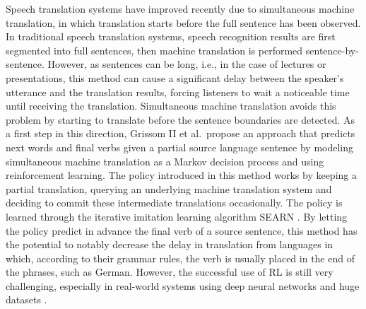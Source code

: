 Speech translation systems have improved recently due to simultaneous machine translation, in which translation starts before the full sentence has been observed. In traditional speech translation systems, speech recognition results are first segmented into full sentences, then machine translation is performed sentence-by-sentence. However, as sentences can be long, i.e., in the case of lectures or presentations, this method can cause a significant delay between the speaker's utterance and the translation results, forcing listeners to wait a noticeable time until receiving the translation. Simultaneous machine translation avoids this problem by starting to translate before the sentence boundaries are detected. As a first step in this direction, Grissom II et al.\  propose an approach that predicts next words and final verbs given a partial source language sentence by modeling simultaneous machine translation as a Markov decision process and using reinforcement learning. The policy introduced in this method works by keeping a partial translation, querying an underlying machine translation system and deciding to commit these intermediate translations occasionally. The policy is learned through the iterative imitation learning algorithm SEARN . By letting the policy predict in advance the final verb of a source sentence, this method has the potential to notably decrease the delay in translation from languages in which, according to their grammar rules, the verb is usually placed in the end of the phrases, such as German. However, the successful use of RL is still very challenging, especially in real-world systems using deep neural networks and huge datasets .
